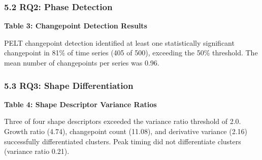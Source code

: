 \subsubsection{5.2 RQ2: Phase Detection}

\textbf{Table 3: Changepoint Detection Results}

\begin{table}[htbp]
\centering
{}
\end{table}

PELT changepoint detection identified at least one statistically significant changepoint in 81\% of time series (405 of 500), exceeding the 50\% threshold. The mean number of changepoints per series was 0.96.

\subsubsection{5.3 RQ3: Shape Differentiation}

\textbf{Table 4: Shape Descriptor Variance Ratios}

\begin{table}[htbp]
\centering
{}
\end{table}

Three of four shape descriptors exceeded the variance ratio threshold of 2.0. Growth ratio (4.74), changepoint count (11.08), and derivative variance (2.16) successfully differentiated clusters. Peak timing did not differentiate clusters (variance ratio 0.21).

